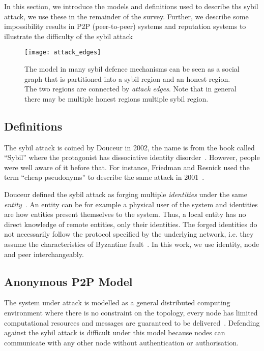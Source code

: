 In this section, we introduce the models and definitions used to describe ths
sybil attack, we use these in the remainder of the survey. Further, we describe
some impossibility results in P2P (peer-to-peer) systems and reputation systems
to illustrate the difficulty of the sybil attack

\begin{figure}
  \centering
  \texttt{[image: attack\_edges]}
  \caption{The model in many sybil defence mechanisms can be seen as a social
    graph that is partitioned into a sybil region and an honest region. The two
    regions are connected by \emph{attack edges}. Note that in general there may
    be multiple honest regions multiple sybil region. }
  \label{fig:attack-edge}
\end{figure}

\subsection{Definitions}
The sybil attack is coined by Douceur in 2002, the name is from the book called
``Sybil'' where the protagonist has dissociative identity
disorder~\cite{douceur2002sybil}. However, people were well aware of it before
that. For instance, Friedman and Resnick used the term ``cheap pseudonyms'' to
describe the same attack in 2001~\cite{resnick2001social}.

Douceur defined the sybil attack as forging multiple \emph{identities} under the
same \emph{entity}~\cite{douceur2002sybil}. An entity can be for example a
physical user of the system and identities are how entities present themselves
to the system. Thus, a local entity has no direct knowledge of remote entities,
only their identities. The forged identities do not necessarily follow the
protocol specified by the underlying network, i.e. they assume the
characteristics of Byzantine fault~\cite{lamport1982byzantine}. In this work, we
use identity, node and peer interchangeably.

\subsection{Anonymous P2P Model}
The system under attack is modelled as a general distributed computing
environment where there is no constraint on the topology, every node has limited
computational resources and messages are guaranteed to be
delivered~\cite{douceur2002sybil}. Defending against the sybil attack is
difficult under this model because nodes can communicate with any other node
without authentication or authorisation.

